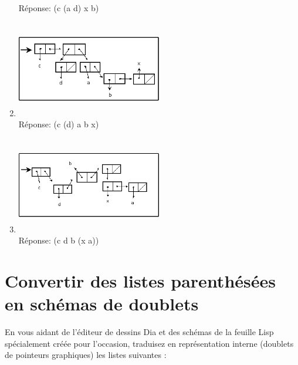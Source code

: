 \documentclass[a4paper, 11pt]{article}
\begin{document}
\begin{enumerate}
Réponse: (c (a d) x b)
  \item \includegraphics[height=120pt, width=180pt]{Pointeurs_Exo5.png}\\
Réponse: (c (d) a b x)
  \item \includegraphics[height=120pt, width=180pt]{Pointeurs_Exo6.png}\\
Réponse: (c d b (x a))
\end{enumerate}

\section{Convertir des listes parenthésées en schémas de doublets}

En vous aidant de l'éditeur de dessins Dia et des schémas de la feuille Lisp spécialement créée pour l'occasion, traduisez en représentation interne (doublets de pointeurs graphiques) les listes suivantes :\\
\end{document}
